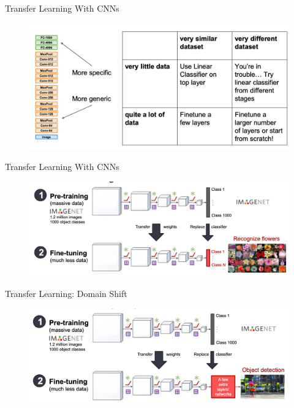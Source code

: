 \documentclass[serif, aspectratio=169]{beamer}
\begin{document}
\begin{frame}{Transfer Learning With CNNs}
	\begin{figure}[htpb]
		\begin{center}
			\includegraphics[keepaspectratio, scale=0.25]{pic/TL_cnn3}
		\end{center}
	\end{figure}
\end{frame}

\begin{frame}{Transfer Learning With CNNs}
	\begin{figure}[htpb]
		\begin{center}
			\includegraphics[keepaspectratio, scale=0.25]{pic/TL_idea}
		\end{center}
	\end{figure}
\end{frame}

\begin{frame}{Transfer Learning: Domain Shift}
	\begin{figure}[htpb]
		\begin{center}
			\includegraphics[keepaspectratio, scale=0.25]{pic/TL_domain_change}
		\end{center}
	\end{figure}
\end{frame}
\end{document}
